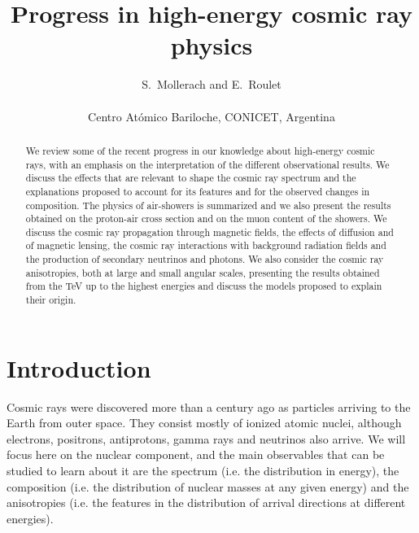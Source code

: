 \documentclass[twoside,12pt]{article}
\begin{document}
\title{ \vspace{1cm} Progress in high-energy cosmic ray physics}
\author{S.\ Mollerach and E.\ Roulet\\
  \\
  Centro At\'omico Bariloche, CONICET, Argentina}
\maketitle
\begin{abstract}
  We review some of the recent progress in our knowledge about high-energy cosmic rays, with an emphasis on the interpretation of the different observational results. We discuss the effects that are relevant to shape the cosmic ray spectrum and the explanations proposed to account for its features and for the observed changes in composition. The physics of air-showers is summarized and we also present the results obtained on the proton-air cross section and on the muon content of the showers. We discuss the cosmic ray propagation through magnetic fields, the effects of diffusion and of magnetic lensing, the cosmic ray interactions with background radiation fields and the production of secondary neutrinos and photons. We also consider the cosmic ray anisotropies, both at large and small angular scales, presenting the results obtained from the TeV up to the highest energies and discuss the models proposed to explain their origin.
\end{abstract}
\section{Introduction}


Cosmic rays were discovered more than a century ago as particles arriving to the Earth from outer space. They consist mostly of ionized atomic nuclei, although electrons, positrons, antiprotons, gamma rays and neutrinos also arrive. We will focus here on the nuclear component, and the main observables that can be studied to learn about it are the spectrum (i.e. the distribution in energy), the composition (i.e. the distribution of nuclear masses at any given energy) and the anisotropies (i.e. the features in the distribution of arrival directions at different energies). 
\end{document}
